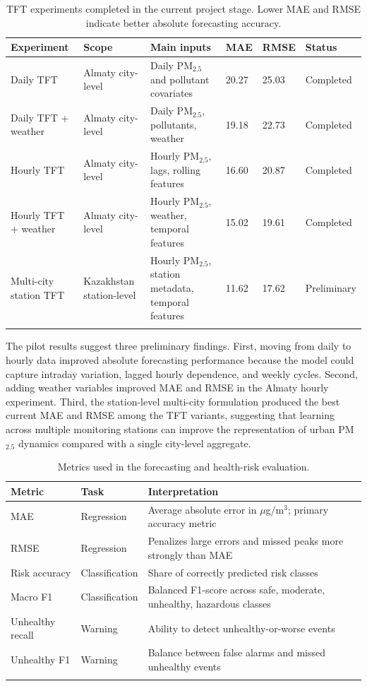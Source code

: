 \documentclass[pdflatex,sn-mathphys-num]{sn-jnl}
\begin{document}
\begin{table}[h]
\caption{TFT experiments completed in the current project stage. Lower MAE and RMSE indicate better absolute forecasting accuracy.}\label{tab:pilot_models}
\begin{tabular}{@{}llllll@{}}
\toprule
Experiment & Scope & Main inputs & MAE & RMSE & Status\\
\midrule
Daily TFT & Almaty city-level & Daily PM$_{2.5}$ and pollutant covariates & 20.27 & 25.03 & Completed\\
Daily TFT + weather & Almaty city-level & Daily PM$_{2.5}$, pollutants, weather & 19.18 & 22.73 & Completed\\
Hourly TFT & Almaty city-level & Hourly PM$_{2.5}$, lags, rolling features & 16.60 & 20.87 & Completed\\
Hourly TFT + weather & Almaty city-level & Hourly PM$_{2.5}$, weather, temporal features & 15.02 & 19.61 & Completed\\
Multi-city station TFT & Kazakhstan station-level & Hourly PM$_{2.5}$, station metadata, temporal features & 11.62 & 17.62 & Preliminary\\
\botrule
\end{tabular}
\end{table}

The pilot results suggest three preliminary findings. First, moving from daily to hourly data improved absolute forecasting performance because the model could capture intraday variation, lagged hourly dependence, and weekly cycles. Second, adding weather variables improved MAE and RMSE in the Almaty hourly experiment. Third, the station-level multi-city formulation produced the best current MAE and RMSE among the TFT variants, suggesting that learning across multiple monitoring stations can improve the representation of urban PM$_{2.5}$ dynamics compared with a single city-level aggregate.

\begin{table}[h]
\caption{Metrics used in the forecasting and health-risk evaluation.}\label{tab:metrics}
\begin{tabular}{@{}lll@{}}
\toprule
Metric & Task & Interpretation\\
\midrule
MAE & Regression & Average absolute error in $\mu$g/m$^3$; primary accuracy metric\\
RMSE & Regression & Penalizes large errors and missed peaks more strongly than MAE\\
Risk accuracy & Classification & Share of correctly predicted risk classes\\
Macro F1 & Classification & Balanced F1-score across safe, moderate, unhealthy, hazardous classes\\
Unhealthy recall & Warning & Ability to detect unhealthy-or-worse events\\
Unhealthy F1 & Warning & Balance between false alarms and missed unhealthy events\\
\botrule
\end{tabular}
\end{table}
\end{document}
